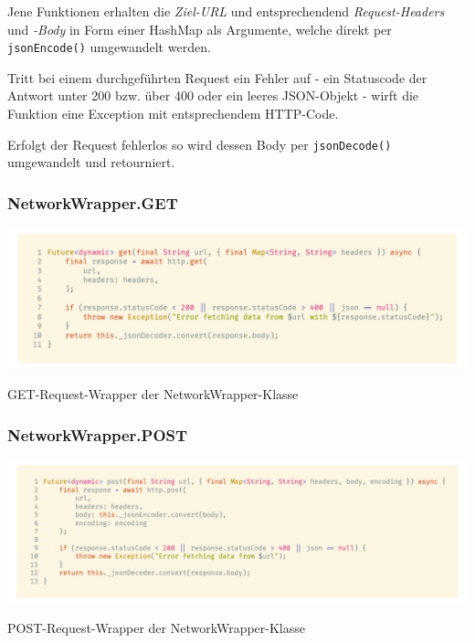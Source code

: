 Jene Funktionen erhalten die \textit{Ziel-URL} und entsprechendend \textit{Request-Headers} und \textit{-Body} in Form einer HashMap
als Argumente, welche direkt per \lstinline{jsonEncode()} umgewandelt werden.

Tritt bei einem durchgeführten Request ein Fehler auf - ein Statuscode der Antwort unter 200 bzw. über 400 oder ein
leeres JSON-Objekt - wirft die Funktion eine Exception mit entsprechendem HTTP-Code.

Erfolgt der Request fehlerlos so wird dessen Body per \lstinline{jsonDecode()} umgewandelt und retourniert.

\subsubsection{NetworkWrapper.GET}

\begin{code}
    \centering
    \includegraphics[width=1\textwidth]{images/Client/util/network-wrapper/networkWrapperGET.png}
    \vspace{-25pt}
    \caption{GET-Request-Wrapper der NetworkWrapper-Klasse}
\end{code}

\subsubsection{NetworkWrapper.POST}

\begin{code}
    \centering
    \includegraphics[width=1\textwidth]{images/Client/util/network-wrapper/networkWrapperPOST.png}
    \vspace{-25pt}
    \caption{POST-Request-Wrapper der NetworkWrapper-Klasse}
\end{code}
